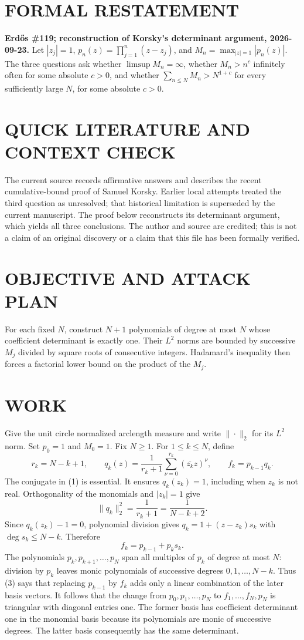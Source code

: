 \section{FORMAL RESTATEMENT}
\textbf{Erd\H{o}s \#119; reconstruction of Korsky's determinant argument, 2026-09-23.}
Let $|z_j|=1$, $p_n(z)=\prod_{j=1}^n(z-z_j)$, and $M_n=\max_{|z|=1}|p_n(z)|$. The three questions ask whether $\limsup M_n=\infty$, whether $M_n>n^c$ infinitely often for some absolute $c>0$, and whether $\sum_{n\leq N}M_n>N^{1+c}$ for every sufficiently large $N$, for some absolute $c>0$.

\section{QUICK LITERATURE AND CONTEXT CHECK}
The current source records affirmative answers and describes the recent cumulative-bound proof of Samuel Korsky. Earlier local attempts treated the third question as unresolved; that historical limitation is superseded by the current manuscript. The proof below reconstructs its determinant argument, which yields all three conclusions. The author and source are credited; this is not a claim of an original discovery or a claim that this file has been formally verified.

\section{OBJECTIVE AND ATTACK PLAN}
For each fixed $N$, construct $N+1$ polynomials of degree at most $N$ whose coefficient determinant is exactly one. Their $L^2$ norms are bounded by successive $M_j$ divided by square roots of consecutive integers. Hadamard's inequality then forces a factorial lower bound on the product of the $M_j$.

\section{WORK}
Give the unit circle normalized arclength measure and write $\|\cdot\|_2$ for its $L^2$ norm. Set $p_0=1$ and $M_0=1$. Fix $N\geq1$. For $1\leq k\leq N$, define
\[
r_k=N-k+1,\qquad q_k(z)=\frac1{r_k+1}\sum_{\nu=0}^{r_k}(\overline{z_k}z)^\nu,
\qquad f_k=p_{k-1}q_k.
\tag{1}
\]
The conjugate in (1) is essential. It ensures $q_k(z_k)=1$, including when $z_k$ is not real. Orthogonality of the monomials and $|z_k|=1$ give
\[
\|q_k\|_2^2=\frac1{r_k+1}=\frac1{N-k+2}.
\tag{2}
\]
Since $q_k(z_k)-1=0$, polynomial division gives $q_k=1+(z-z_k)s_k$ with $\deg s_k\leq N-k$. Therefore
\[
f_k=p_{k-1}+p_ks_k.
\tag{3}
\]
The polynomials $p_k,p_{k+1},\ldots,p_N$ span all multiples of $p_k$ of degree at most $N$: division by $p_k$ leaves monic polynomials of successive degrees $0,1,\ldots,N-k$. Thus (3) says that replacing $p_{k-1}$ by $f_k$ adds only a linear combination of the later basis vectors. It follows that the change from $p_0,p_1,\ldots,p_N$ to $f_1,\ldots,f_N,p_N$ is triangular with diagonal entries one. The former basis has coefficient determinant one in the monomial basis because its polynomials are monic of successive degrees. The latter basis consequently has the same determinant.

